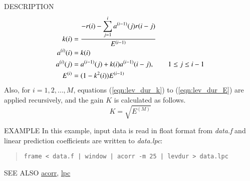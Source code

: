 \begin{qsection}{DESCRIPTION}
\begin{align}
k(i)       &= \frac{\displaystyle{-r(i)-\sum_{j=1}^i a^{(i-1)}(j)r(i-j)}}
		{E^{(i-1)}} \label{eqn:lev_dur_k}\notag\\
a^{(i)}(i) &= k(i) \notag\\
a^{(i)}(j) &=  a^{(i-1)}(j) + k(i) a^{(i-1)}(i-j), 
		\qquad 1\leq j \leq i-1\\
E^{(i)}    &= (1-k^2(i)) E^{(i-1)} \label{eqn:lev_dur_E}
\end{align}
Also, for $i=1,2,\ldots,M$, equations (\ref{eqn:lev_dur_k}) to
 (\ref{eqn:lev_dur_E}) are applied recursively,
and the gain $K$ is calculated as follows.
\begin{displaymath}
K = \sqrt{E^{(M)}}
\end{displaymath}
\end{qsection}

\begin{options}
\end{options}

\begin{qsection}{EXAMPLE}
In this example, input data is read in float format from
{\em data.f} and linear prediction coefficients are written
to {\em data.lpc}:
\begin{quote}
 \verb!frame < data.f | window | acorr -m 25 | levdur > data.lpc!
\end{quote} 
\end{qsection}

\begin{qsection}{SEE ALSO}
\hyperlink{acorr}{acorr},
\hyperlink{lpc}{lpc}
\end{qsection}
